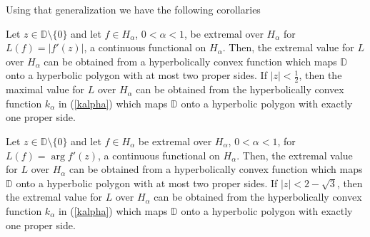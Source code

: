 \documentclass[final]{siamltex}
\newcommand{\dsp}{\displaystyle}
\newcommand{\D}{\mathbb{D}}
\begin{document}
Using that generalization we have the following corollaries 

\vspace{0.1in}

\begin{corollary}\label{cor3}
Let $z \in \D \setminus \{0\}$ and let $f \in H_{\alpha}$, $0 < \alpha < 1$,  be extremal over $H_{\alpha}$ for ${\dsp L(f) = |{f'(z)}|}$, a continuous functional on $H_{\alpha}$.  Then, the extremal value for $L$ over $H_{\alpha}$ can be obtained from a hyperbolically convex function which maps $\D$ onto a hyperbolic polygon with at most two proper sides.  If $|z| < \frac{1}{2}$, then the maximal value for $L$ over $H_{\alpha}$ can be obtained from the hyperbolically convex function $k_{\alpha}$ in (\ref{kalpha}) which maps $\D$ onto a hyperbolic polygon with exactly one proper side.
\end{corollary}

\vspace{0.1in}

\begin{corollary}\label{cor4}
Let $z \in \D \setminus \{0\}$ and let $f \in H_{\alpha}$ be extremal over $H_{\alpha}$, $0 < \alpha < 1$,  for ${\dsp L(f) = \arg f'(z)}$, a continuous functional on $H_{\alpha}$.   Then, the extremal value for $L$ over $H_{\alpha}$ can be obtained from a hyperbolically convex function which maps $\D$ onto a hyperbolic polygon with at most two proper sides.  If $|z| < 2-\sqrt{3}$, then the extremal value for $L$ over $H_{\alpha}$ can be obtained from the hyperbolically convex function $k_{\alpha}$ in (\ref{kalpha}) which maps $\D$ onto a hyperbolic polygon with exactly one proper side.
\end{corollary}



\vspace{0.1in}   
\end{document}
